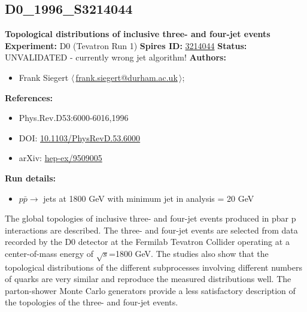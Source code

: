 \subsection[D0\_1996\_S3214044]{D0\_1996\_S3214044\,\cite{Abachi:1995zv}}
\textbf{Topological distributions of inclusive three- and four-jet events}\newline
\textbf{Experiment:} D0 (Tevatron Run 1) \newline
\textbf{Spires ID:} \href{http://www.slac.stanford.edu/spires/find/hep/www?rawcmd=key+3214044}{3214044}\newline
\textbf{Status:} UNVALIDATED - currently wrong jet algorithm!\newline
\textbf{Authors:}
\begin{itemize}
  \item Frank Siegert $\langle\,$\href{mailto:frank.siegert@durham.ac.uk}{frank.siegert@durham.ac.uk}$\,\rangle$;
\end{itemize}
\textbf{References:}
\begin{itemize}
  \item Phys.Rev.D53:6000-6016,1996
  \item DOI: \href{http://dx.doi.org/10.1103/PhysRevD.53.6000}{10.1103/PhysRevD.53.6000}
  \item arXiv: \href{http://arxiv.org/abs/hep-ex/9509005}{hep-ex/9509005}
\end{itemize}
\textbf{Run details:}
\begin{itemize}

  \item $p \bar{p} \to$ jets at 1800 GeV with minimum jet \pT in analysis = 20 GeV\end{itemize}

\noindent The global topologies of inclusive three- and four-jet events produced in pbar p interactions are described. The three- and four-jet events are selected from data recorded by the D0 detector at the Fermilab Tevatron Collider operating at a center-of-mass energy of $\sqrt{s}$=1800 GeV. The studies also show that the topological distributions of the different subprocesses involving different numbers of quarks are very similar and reproduce the measured distributions well. The parton-shower Monte Carlo generators provide a less satisfactory description of the topologies of the three- and four-jet events.

\clearpage


\clearpage

